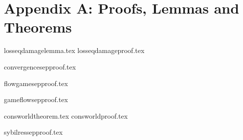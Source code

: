 \section*{Appendix A: Proofs, Lemmas and Theorems}
  {losseqdamagelemma.tex}
  {losseqdamageproof.tex}

  {convergencesepproof.tex}

  {flowgamesepproof.tex}

  {gameflowsepproof.tex}

  {consworldtheorem.tex}
  {consworldproof.tex}
 
  {sybilressepproof.tex}

